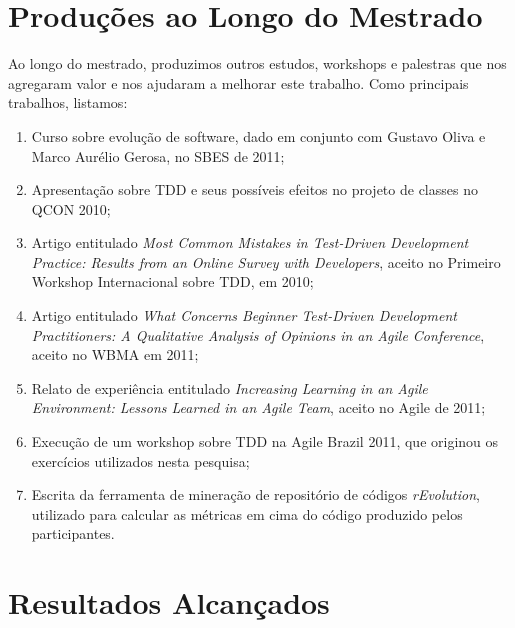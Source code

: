 \section{Produções ao Longo do Mestrado}

Ao longo do mestrado, produzimos outros estudos, workshops e palestras que 
nos agregaram valor e nos ajudaram a melhorar este trabalho. Como principais
trabalhos, listamos:

\begin{enumerate}
	
	\item Curso sobre evolução de software, dado em conjunto com Gustavo Oliva e
	Marco Aurélio Gerosa, no SBES de 2011;
	
	\item Apresentação sobre TDD e seus possíveis efeitos no projeto de classes no
	QCON 2010;
	
	\item Artigo entitulado \textit{Most Common Mistakes in Test-Driven Development Practice: Results from an Online Survey with Developers},
	aceito no Primeiro Workshop Internacional sobre TDD, em 2010;
	
	\item Artigo entitulado \textit{What Concerns Beginner Test-Driven Development Practitioners: A Qualitative Analysis of Opinions in an Agile Conference},
	aceito no WBMA em 2011;
	
	\item Relato de experiência entitulado \textit{Increasing Learning in an Agile Environment: Lessons Learned in an Agile Team}, aceito
	no Agile de 2011;
	
	\item Execução de um workshop sobre TDD na Agile Brazil 2011, que originou os exercícios utilizados nesta pesquisa;
	
	\item Escrita da ferramenta de mineração de repositório de códigos \textit{rEvolution}, utilizado para calcular as métricas
	em cima do código produzido pelos participantes.
	
\end{enumerate}

\section{Resultados Alcançados}

